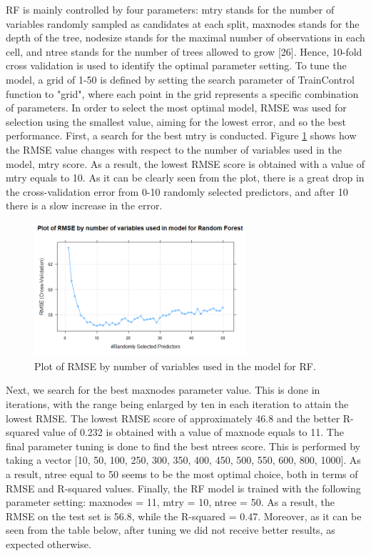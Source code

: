 \documentclass{usiinftr}
\begin{document}
RF is mainly controlled by four parameters: mtry stands for the number of variables randomly sampled as candidates at each split, maxnodes stands for the depth of the tree, nodesize stands for the maximal number of observations in each cell, and ntree stands for the number of trees allowed to grow [26]. Hence, 10-fold cross validation is used to identify the optimal parameter setting. To tune the model, a grid of 1-50 is defined by setting the search parameter of TrainControl function to "grid", where each point in the grid represents a specific combination of parameters. In order to select the most optimal model, RMSE was used for selection using the smallest value, aiming for the lowest error, and so the best performance. First, a search for the best mtry is conducted. Figure \ref{RFRMSE} shows how the RMSE value changes with respect to the number  of variables used in the model, mtry score. As a result, the lowest RMSE score is obtained with a value of mtry equals to 10. As it can be clearly seen from the plot, there is a great drop in the cross-validation error from 0-10 randomly selected predictors, and after 10 there is a slow increase in the error. 

\begin{figure}[h!] 
\centering
\includegraphics[width=0.7\textwidth]{images/image121.png}
\caption{Plot of RMSE by number of variables used in the model for RF.}
\label{RFRMSE}
\end{figure}

Next, we search for the best maxnodes parameter value. This is done in iterations, with the range being enlarged by ten in each iteration to attain the lowest RMSE. The lowest RMSE score of approximately 46.8 and the better R-squared value of 0.232 is obtained with a value of maxnode equals to 11.  The final parameter tuning is done to find the best ntrees score. This is performed by taking a vector [10, 50, 100, 250, 300, 350, 400, 450, 500, 550, 600, 800, 1000]. As a result, ntree equal to 50 seems to be the most optimal choice, both in terms of RMSE and R-squared values. Finally, the RF model is trained with the following parameter setting: maxnodes = 11, mtry = 10, ntree = 50. As a result, the RMSE on the test set is 56.8, while the R-squared = 0.47. Moreover, as it can be seen from the table below, after tuning we did not receive better results, as expected otherwise. 
\end{document}
